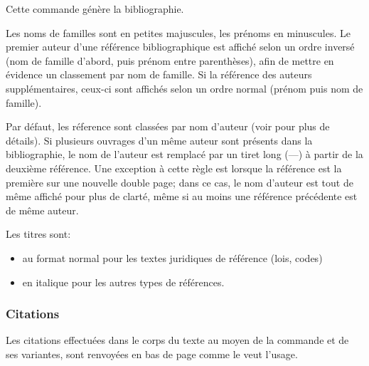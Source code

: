 \documentclass{ltxdockit}
\begin{document}
\begin{ltxsyntax}


Cette commande génère la bibliographie.

Les noms de familles sont en petites majuscules, les prénoms en minuscules. Le premier auteur d'une référence bibliographique est affiché selon un ordre inversé (nom de famille d'abord, puis prénom entre parenthèses), afin de mettre en évidence un classement par nom de famille. Si la référence des auteurs supplémentaires, ceux-ci sont affichés selon un ordre normal (prénom puis nom de famille).

Par défaut, les réference sont classées par nom d'auteur (voir  pour plus de détails).
Si plusieurs ouvrages d'un même auteur sont présents dans la bibliographie, le nom de l'auteur est remplacé par un tiret long (---) à partir de la deuxième référence. Une exception à cette règle est lorsque la référence est la première sur une nouvelle double page; dans ce cas, le nom d'auteur est tout de même affiché pour plus de clarté, même si au moins une référence précédente est de même auteur.

Les titres sont:
\begin{itemize}
\item au format normal pour les textes juridiques de référence (lois, codes)
\item en italique pour les autres types de références.
\end{itemize}

\end{ltxsyntax}

\subsubsection{Citations}

Les citations effectuées dans le corps du texte au moyen de la commande  et de ses variantes, sont renvoyées en bas de page comme le veut l'usage. 
\end{document}
